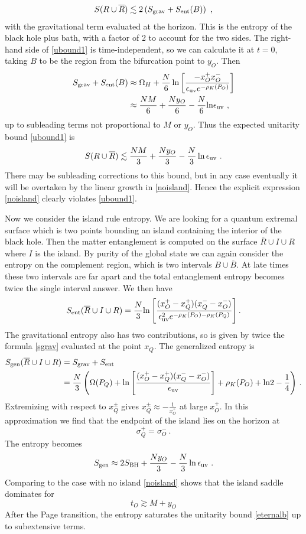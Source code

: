 \documentclass[11pt,oneside,letterpaper]{article}
\newcommand{\f}{\frac}
\newcommand{\be}{\begin{equation}}
\newcommand{\ee}{\end{equation}}
\def\be{\begin{eqnarray}}
\def\ee{\end{eqnarray}}
\let\f=\frac
\def\be{\begin{equation}}
\def\ee{\end{equation}}
\def\m{{M}}
\def\euv{\epsilon_{\rm uv}}
\def\log{{\rm ln}}
\numberwithin{equation}{section}
\def \be {\begin{equation}}
\def \ee {\end{equation}}
\begin{document}
\be\label{ubound1}
S(R \cup \overline{R}) \lesssim 2\left( S_{\rm grav} + S_{\rm ent}(B)  \right) \ ,
\ee
with the gravitational term evaluated at the horizon. This is the entropy of the black hole plus bath, with a factor of 2  to account for the two sides. The right-hand side of \eqref{ubound1} is time-independent, so we can calculate it at $t=0$, taking $B$ to be the region from the bifurcation point to $y_O$. Then
\begin{align}
S_{\rm grav} + S_{\rm ent}(B) &\approx
 \Omega_H + \frac{N}{6}\ln \left[ \frac{-x_O^+ x_O^-}{\epsilon_{\rm uv}e^{-\rho_K(P_O)}}\right]\\
&\approx \frac{NM}{6}  + \frac{N y_O}{6} - \frac{N}{6}\log \epsilon_{\rm uv} \ ,
\end{align}
up to subleading terms not proportional to $M$ or $y_O$. Thus the expected unitarity bound \eqref{ubound1} is
\be\label{eternalb}
S(R \cup \overline{R}) \lesssim \frac{NM}{3} + \frac{Ny_O}{3} - \frac{N}{3} \ln \epsilon_{\rm uv} \ .
\ee
There may be subleading corrections to this bound, but in any case eventually it will be overtaken by the linear growth in \eqref{noisland}.  Hence the explicit expression \eqref{noisland} clearly violates \eqref{ubound1}.


Now we consider the island rule entropy. We are looking for a quantum extremal surface which is two points bounding an island containing the interior of the black hole. Then the matter entanglement is computed on the surface $\overline{R} \cup I\cup R$ where $I$ is the island. By purity of the global state we can again consider the entropy on the complement region, which is two intervals $B \cup \overline{B}$. At late times these two intervals are far apart and the total  entanglement entropy becomes twice the single interval answer.  We then have
\be
S_{\text{ent}}({\overline{R}\cup I \cup R}) = \f{N}{3}\log \left[\f{(x_O^+-x_Q^+)(x_Q^--x_O^-)}{\euv ^2 e^{-\rho_K(P_O)-\rho_K(P_Q)}}\right].
\ee
The gravitational entropy also has two contributions, so is given by twice the formula \eqref{sgrav} evaluated at the point $x_Q$.
The generalized entropy is 
\begin{align}
S_{\text{gen}}(\overline{R}\cup I\cup R) &= S_{\text{grav}} + S_{\text{ent}}   \\
&=\f N 3 \left(\Omega(P_Q)+\log \left[\f{(x_O^+-x_Q^+)(x_Q^--x_O^-)}{\epsilon_{\rm uv}}\right] + \rho_K(P_O) + \log 2 - \f 1 4\right)\, . \notag
\end{align}
Extremizing with respect to $x_Q^\pm$ gives 
$x_Q^\pm \approx -\f{1}{ x_O^\mp}$ at large $x_O^+$. In this approximation we find that the endpoint of the island lies on the horizon at
\be
\sigma_Q^+ = \sigma_O^- \ .
\ee
The entropy becomes 
\begin{align}\label{seternali}
S_{\text{gen}} \approx 2S_{\rm BH} + \frac{Ny_O}{3} - \frac{N}{3} \ln \epsilon_{\rm uv} \ .
\end{align}
Comparing to the case with no island \eqref{noisland} shows that the island saddle dominates for 
\be
t_O \gtrsim  {\m}{}  +y_O
\ee
After the Page transition, the entropy saturates the unitarity bound \eqref{eternalb} up to subextensive terms. 
\end{document}
